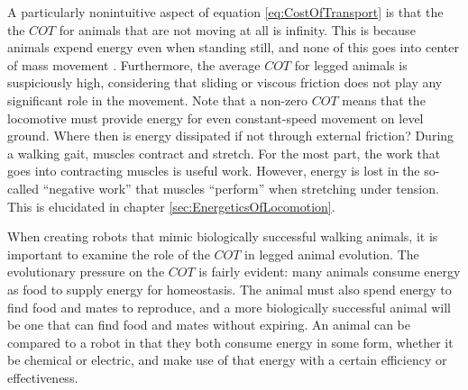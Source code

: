 A particularly nonintuitive aspect of equation \ref{eq:CostOfTransport} is that the the $COT$ for animals that are not moving at all is infinity. This is because animals expend energy even when standing still, and none of this goes into center of mass movement \cite{radhakrishnan98}. Furthermore, the average $COT$ for legged animals is suspiciously high, considering that sliding or viscous friction does not play any significant role in the movement. Note that a non-zero $COT$ means that the locomotive must provide energy for even constant-speed movement on level ground. Where then is energy dissipated if not through external friction? During a walking gait, muscles contract and stretch. For the most part, the work that goes into contracting muscles is useful work. However, energy is lost in the so-called ``negative work'' that muscles ``perform'' when stretching under tension. This is elucidated in chapter \ref{sec:EnergeticsOfLocomotion}.

When creating robots that mimic biologically successful walking animals, it is important to examine the role of the $COT$ in legged animal evolution. The evolutionary pressure on the $COT$ is fairly evident: many animals consume energy as food to supply energy for homeostasis. The animal must also spend energy to find food and mates to reproduce, and a more biologically successful animal will be one that can find food and mates without expiring. An animal can be compared to a robot in that they both consume energy in some form, whether it be chemical or electric, and make use of that energy with a certain efficiency or effectiveness.
